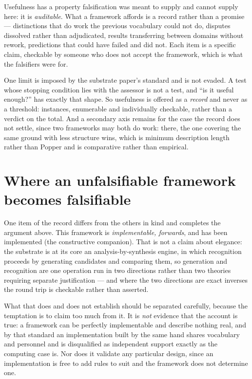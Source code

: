 \documentclass[11pt,a4paper]{article}
\theoremstyle{remark}\newtheorem{remark}[definition]{Remark}
\begin{document}
Usefulness has a property falsification was meant to supply and cannot supply here: it is
\emph{auditable}. What a framework affords is a record rather than a promise --- distinctions that do
work the previous vocabulary could not do, disputes dissolved rather than adjudicated, results
transferring between domains without rework, predictions that could have failed and did not. Each item
is a specific claim, checkable by someone who does not accept the framework, which is what the
falsifiers were for.

One limit is imposed by the substrate paper's standard and is not evaded. A test whose stopping condition
lies with the assessor is not a test, and ``is it useful enough?'' has exactly that shape. So
usefulness is offered as a \emph{record} and never as a threshold: instances, enumerable and
individually checkable, rather than a verdict on the total. And a secondary axis remains for the case
the record does not settle, since two frameworks may both do work: there, the one covering the same
ground with less structure wins, which is minimum description length rather than Popper and is
comparative rather than empirical.

\section{Where an unfalsifiable framework becomes falsifiable}\label{sec:implementable}
One item of the record differs from
the others in kind and completes the argument above. This framework is \emph{implementable, forwards},
and has been implemented (the constructive companion). That is not a claim about elegance: the
substrate is at its core an analysis-by-synthesis engine, in which recognition proceeds by generating
candidates and comparing them, so generation and recognition are one operation run in two directions
rather than two theories requiring separate justification --- and where the two directions are exact
inverses the round trip is checkable rather than asserted.

What that does and does not establish should be separated carefully, because the temptation is to
claim too much from it. It is \emph{not} evidence that the account is true: a framework can be
perfectly implementable and describe nothing real, and by that standard an implementation
built by the same hand shares vocabulary and personnel and is disqualified as independent support
exactly as the computing case is. Nor does it validate any particular design, since an implementation
is free to add rules to suit and the framework does not determine one.
\end{document}
